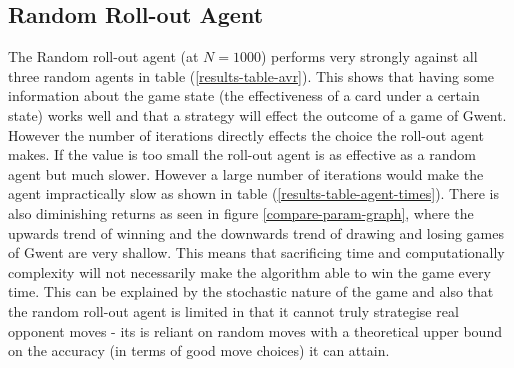 \documentclass[journal]{IEEEtran}
\begin{document}
\subsection{Random Roll-out Agent}
The Random roll-out agent (at $N=1000$) performs very strongly against all three random agents in table (\ref{results-table-avr}). This shows that having some information about the game state (the effectiveness of a card under a certain state) works well and that a strategy will effect the outcome of a game of Gwent. However the number of iterations directly effects the choice the roll-out agent makes. If the value is too small the roll-out agent is as effective as a random agent but much slower. However a large number of iterations would make the agent impractically slow as shown in table (\ref{results-table-agent-times}). There is also diminishing returns as seen in figure \ref{compare-param-graph}, where the upwards trend of winning and the downwards trend of drawing and losing games of Gwent are very shallow. This means that sacrificing time and computationally complexity will not necessarily make the algorithm able to win the game every time. This can be explained by the stochastic nature of the game and also that the random roll-out agent is limited in that it cannot truly strategise real opponent moves - its is reliant on random moves with a theoretical upper bound on the accuracy (in terms of good move choices) it can attain.\\
\end{document}
